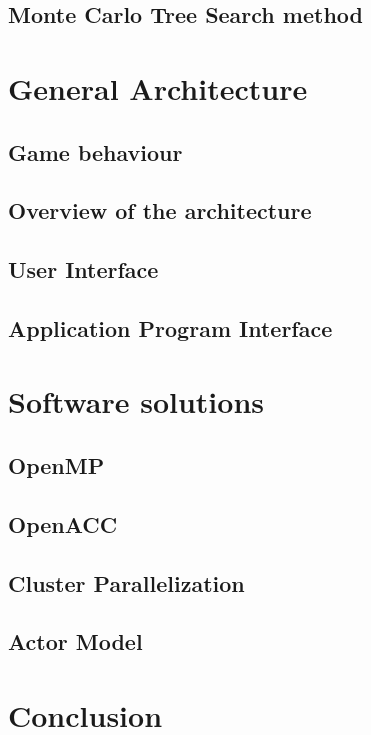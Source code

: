 \documentclass[12pt]{article}
\begin{document}
	\subsection{Monte Carlo Tree Search method}		\label{sec:mcts}			
\newpage

\section{General Architecture}					\label{sec:generalArchitecture} 		
	\subsection{Game behaviour}				\label{sec:gameBehavioiur}		
	\subsection{Overview of the architecture}		\label{sec:globalview}			
	\subsection{User Interface}				\label{sec:ui}				
	\subsection{Application Program Interface}		\label{sec:api}				
\newpage

\section{Software solutions}					\label{sec:softwareSolutions}
	\subsection{OpenMP}					\label{sec:openmp}				
	\subsection{OpenACC}					\label{sec:openacc}			
	\subsection{Cluster Parallelization}			\label{sec:mpi}				
	\subsection{Actor Model}					\label{sec:actorModel}			
\newpage

\section{Conclusion}						\label{sec:conclusion}			
\newpage



\end{document}
